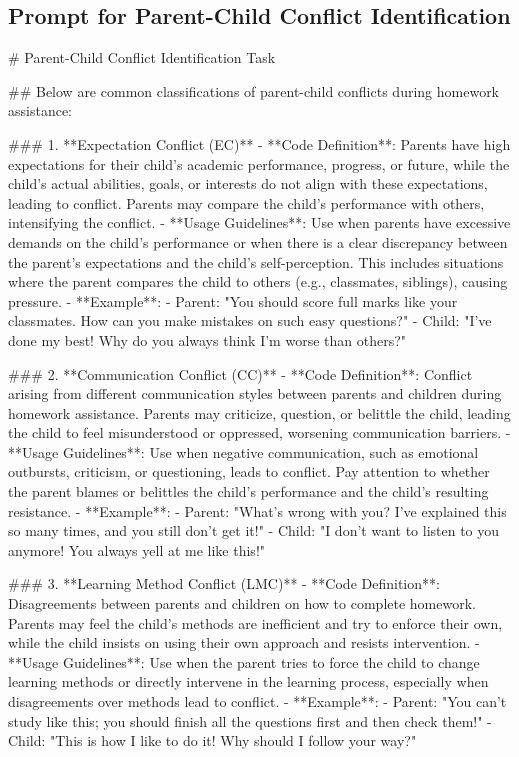 \subsection{Prompt for Parent-Child Conflict Identification}


\begingroup
\footnotesize
\begin{spverbatim}
# Parent-Child Conflict Identification Task

## Below are common classifications of parent-child conflicts during homework assistance:

### 1. **Expectation Conflict (EC)**
- **Code Definition**: Parents have high expectations for their child's academic performance, progress, or future, while the child's actual abilities, goals, or interests do not align with these expectations, leading to conflict. Parents may compare the child's performance with others, intensifying the conflict.
- **Usage Guidelines**: Use when parents have excessive demands on the child's performance or when there is a clear discrepancy between the parent's expectations and the child's self-perception. This includes situations where the parent compares the child to others (e.g., classmates, siblings), causing pressure.
- **Example**:  
  - Parent: "You should score full marks like your classmates. How can you make mistakes on such easy questions?"
  - Child: "I've done my best! Why do you always think I'm worse than others?"

### 2. **Communication Conflict (CC)**
- **Code Definition**: Conflict arising from different communication styles between parents and children during homework assistance. Parents may criticize, question, or belittle the child, leading the child to feel misunderstood or oppressed, worsening communication barriers.
- **Usage Guidelines**: Use when negative communication, such as emotional outbursts, criticism, or questioning, leads to conflict. Pay attention to whether the parent blames or belittles the child's performance and the child's resulting resistance.
- **Example**:  
  - Parent: "What's wrong with you? I've explained this so many times, and you still don't get it!"
  - Child: "I don't want to listen to you anymore! You always yell at me like this!"

### 3. **Learning Method Conflict (LMC)**
- **Code Definition**: Disagreements between parents and children on how to complete homework. Parents may feel the child's methods are inefficient and try to enforce their own, while the child insists on using their own approach and resists intervention.
- **Usage Guidelines**: Use when the parent tries to force the child to change learning methods or directly intervene in the learning process, especially when disagreements over methods lead to conflict.
- **Example**:  
  - Parent: "You can't study like this; you should finish all the questions first and then check them!"
  - Child: "This is how I like to do it! Why should I follow your way?"


\end{spverbatim}
